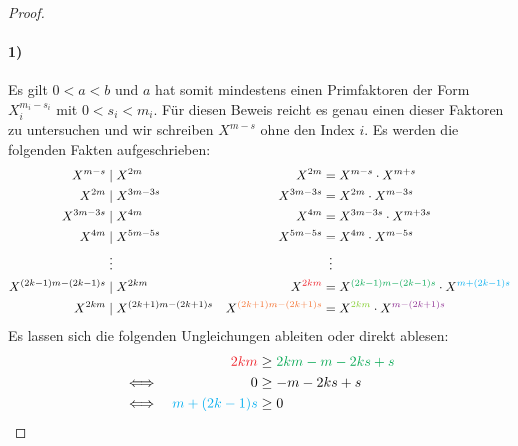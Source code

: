 \begin{proof}
  \paragraph{1)}
  Es gilt $0 < a < b$ und $a$ hat somit mindestens einen Primfaktoren
  der Form $X_i^{m_i - s_i}$ mit $0 < s_i < m_i$.
  Für diesen Beweis reicht es genau einen dieser Faktoren zu untersuchen und wir schreiben
  $X^{m - s}$ ohne den Index $i$. Es werden die folgenden Fakten aufgeschrieben:
  \begin{align*}
    X^{m - s}                                     & \mid X^{2m}                    & X^{2m}      & = X^{m - s} \cdot X^{m + s}    \\
    X^{2m}                                        & \mid X^{3m - 3s}               & X^{3m - 3s} & = X^{2m} \cdot X^{m - 3s}      \\
    X^{3m - 3s}                                   & \mid X^{4m}                    & X^{4m}      & = X^{3m - 3s} \cdot X^{m + 3s} \\
    X^{4m}                                        & \mid X^{5m - 5s}               & X^{5m - 5s} & = X^{4m} \cdot X^{m - 5s}      \\
                                                  & \vdotswithin{\mid}             &             & \vdotswithin{=}                \\
    X^{(2k - 1)m - (2k -1)s}                      & \mid X^{2km}                   &
    X^{\textcolor{Red}{2km}}                      &
    = X^{\textcolor{Green}{(2k - 1)m - (2k -1)s}} \cdot X^{\textcolor{Cyan}{m + (2k -1)s}}                                        \\
    X^{2km}                                       & \mid X^{(2k + 1)m - (2k + 1)s} &
    X^{\textcolor{Orange}{(2k + 1)m - (2k + 1)s}} &
    = X^{\textcolor{LimeGreen}{2km}} \cdot X^{\textcolor{Fuchsia}{m - (2k + 1)s}}
  \end{align*}
  Es lassen sich die folgenden Ungleichungen ableiten oder direkt ablesen:
  \begin{equation}
    \label{eq:33.4.1}
    \begin{aligned}
           &  & \textcolor{Red}{2km}            & \geq \textcolor{Green}{2km - m - 2ks + s} \\
      \iff &  & 0                               & \geq -m - 2ks + s                         \\
      \iff &  & \textcolor{Cyan}{m + (2k - 1)s} & \geq 0
    \end{aligned}
  \end{equation}

\end{proof}
